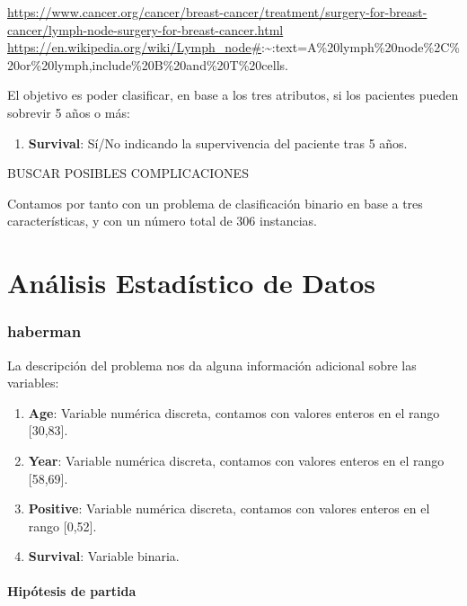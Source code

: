 \url{https://www.cancer.org/cancer/breast-cancer/treatment/surgery-for-breast-cancer/lymph-node-surgery-for-breast-cancer.html}
\url{https://en.wikipedia.org/wiki/Lymph_node\#}:\textasciitilde:text=A\%20lymph\%20node\%2C\%20or\%20lymph,include\%20B\%20and\%20T\%20cells.

El objetivo es poder clasificar, en base a los tres atributos, si los pacientes pueden sobrevir 5 años o más:

\begin{enumerate}
    \def\labelenumi{\arabic{enumi}.}
    \setcounter{enumi}{3}
    \item \textbf{Survival}: Sí/No indicando la supervivencia del paciente tras 5 años.
\end{enumerate}

BUSCAR POSIBLES COMPLICACIONES

Contamos por tanto con un problema de clasificación binario en base a tres características, y con un número total de 306 instancias.

\section{Análisis Estadístico de Datos}

\subsubsection{haberman}

La descripción del problema nos da alguna información adicional sobre las variables:

\begin{enumerate}
    \def\labelenumi{\arabic{enumi}.}
    \item \textbf{Age}: Variable numérica discreta, contamos con valores enteros en el
    rango {[}30,83{]}.
    \item \textbf{Year}: Variable numérica discreta, contamos con valores enteros en el
    rango {[}58,69{]}.
    \item \textbf{Positive}: Variable numérica discreta, contamos con valores enteros en
    el rango {[}0,52{]}.
    \item \textbf{Survival}: Variable binaria.
\end{enumerate}

\paragraph{Hipótesis de partida}

